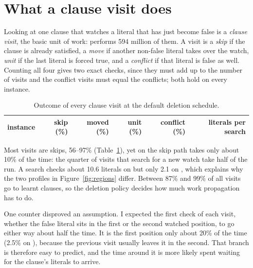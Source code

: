 \section{What a clause visit does}
\label{sec:visits}

Looking at one clause that watches a literal that has just become false is a
\emph{clause visit}, the basic unit of work:  performs 594
million of them. A visit is a \emph{skip} if the clause is already satisfied,
a \emph{move} if another non-false literal takes over the watch, \emph{unit}
if the last literal is forced true, and a \emph{conflict} if that literal is
false as well. Counting all four gives two exact checks, since they must add up
to the number of visits and the conflict visits must equal the conflicts; both
hold on every instance.

\begin{table}[ht]
\centering\small
\begin{tabular}{lrrrrr}
\toprule
instance & skip (\%) & moved (\%) & unit (\%) & conflict (\%) & literals per search \\
\midrule

\end{tabular}
\caption{Outcome of every clause visit at the default deletion schedule.}
\label{tab:visits}
\end{table}

Most visits are skips, 56--97\% (Table~\ref{tab:visits}), yet on
 the skip path takes only about 10\% of the time: the quarter
of visits that search for a new watch take half of the run. A search checks
about 10.6 literals on  but only 2.1 on
, which explains why the two profiles in
Figure~\ref{fig:regions} differ. Between 87\% and 99\% of all visits go to
learnt clauses, so the deletion policy decides how much work propagation has
to do.

One counter disproved an assumption. I expected the first check of each visit,
whether the false literal sits in the first or the second watched position, to
go either way about half the time. It is the first position only about 20\% of
the time (2.5\% on ), because the previous visit usually leaves it
in the second. That branch is therefore easy to predict, and the time around
it is more likely spent waiting for the clause's literals to arrive.
